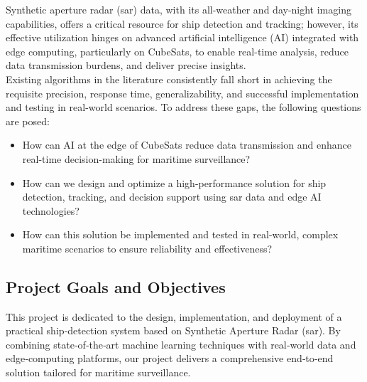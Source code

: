 \documentclass{article}
\begin{document}
Synthetic aperture radar (\acrshort{sar}) data, with its all-weather and day-night imaging capabilities, offers a critical resource for ship detection and tracking; however, its effective utilization hinges on advanced artificial intelligence (AI) integrated with edge computing, particularly on CubeSats, to enable real-time analysis, reduce data transmission burdens, and deliver precise insights. \\

Existing algorithms in the literature consistently fall short in achieving the requisite precision, response time, generalizability, and successful implementation and testing in real-world scenarios. To address these gaps, the following questions are posed:
\begin{itemize}
    \item How can AI at the edge of CubeSats reduce data transmission and enhance real-time decision-making for maritime surveillance? \item How can we design and optimize a high-performance solution for ship detection, tracking, and decision support using \acrshort{sar} data and edge AI technologies? \item How can this solution be implemented and tested in real-world, complex maritime scenarios to ensure reliability and effectiveness? \end{itemize}
\subsection{Project Goals and Objectives}
This project is dedicated to the design, implementation, and deployment of a practical ship‑detection system based on Synthetic Aperture Radar (\acrshort{sar}). By combining state‑of‑the‑art machine learning techniques with real‑world data and edge‑computing platforms, our project delivers a comprehensive end‑to‑end solution tailored for maritime surveillance. \\
\end{document}
